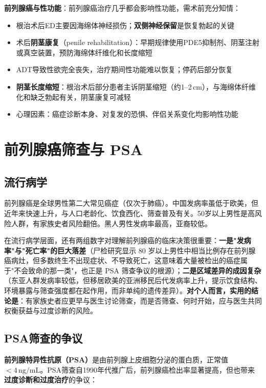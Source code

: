 \documentclass[12pt,a4paper,twoside]{ctexbook}
\begin{document}
\textbf{前列腺癌与性功能}：前列腺癌治疗几乎都会影响性功能，需术前充分知情：
\begin{itemize}[leftmargin=2cm]
	\item 根治术后ED主要因海绵体神经损伤；\textbf{双侧神经保留}是恢复勃起的关键
	\item 术后\textbf{阴茎康复}（penile rehabilitation）：早期规律使用PDE5抑制剂、阴茎注射或真空装置，预防海绵体纤维化和长度缩短
	\item ADT导致性欲完全丧失，治疗期间性功能难以恢复；停药后部分恢复
	\item \textbf{阴茎长度缩短}：根治术后部分患者主诉阴茎缩短（约1--2\,cm），与海绵体纤维化和缺乏勃起有关，阴茎康复可减轻
	\item 心理因素：癌症诊断本身、对复发的恐惧、伴侣关系变化均影响性功能
\end{itemize}

\section{前列腺癌筛查与 PSA}


\label{sec:prostate_cancer}

\subsection{流行病学}

前列腺癌是全球男性第二大常见癌症（仅次于肺癌）。中国发病率虽低于欧美，但近年来快速上升，与人口老龄化、饮食西化、筛查普及有关。50岁以上男性是高风险人群，有家族史者风险翻倍。黑人男性发病率最高，亚裔较低。


在流行病学层面，还有两组数字对理解前列腺癌的临床决策很重要：\textbf{一是"发病率"与"死亡率"的巨大落差}（尸检研究显示 80 岁以上男性中相当比例存在前列腺癌病灶，但多数终生不出现症状、不导致死亡，这意味着大量被检出的癌症属于"不会致命的那一类"，也正是 PSA 筛查争议的根源）；\textbf{二是区域差异的成因复杂}（东亚人群发病率较低，但移居欧美的亚洲移民后代发病率上升，提示饮食结构、环境暴露与筛查强度都在起作用，而非单纯的遗传差异）。\textbf{对个人而言，实用的结论是}：有家族史者应更早与医生讨论筛查，而是否筛查、何时开始，应与医生共同权衡获益与过度诊断的风险。

\subsection{PSA筛查的争议}

\textbf{前列腺特异性抗原（PSA）}是由前列腺上皮细胞分泌的蛋白质，正常值$<4\,\mathrm{ng/mL}$。PSA筛查自1990年代推广后，前列腺癌检出率显著提高，但也带来\textbf{过度诊断和过度治疗}的争议：
\end{document}
